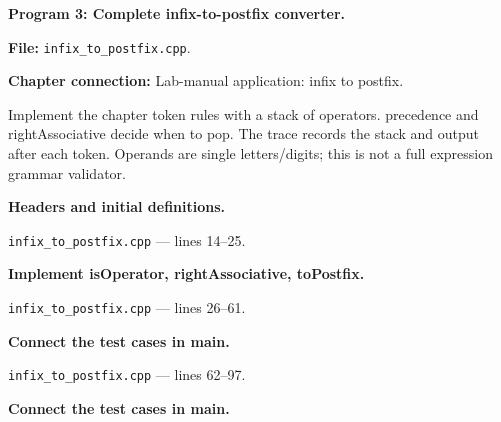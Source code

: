 \textbf{Program 3: Complete infix-to-postfix converter.}

\textbf{File:} \texttt{infix\_to\_postfix.cpp}.

\textbf{Chapter connection:} Lab-manual application: infix to postfix.

Implement the chapter token rules with a stack of operators. precedence and rightAssociative decide when to pop. The trace records the stack and output after each token. Operands are single letters/digits; this is not a full expression grammar validator.



\begin{utpsteps}\setcounter{enumi}{0}\item \textbf{Headers and initial definitions.}\end{utpsteps}

\texttt{infix\_to\_postfix.cpp} --- lines 14--25.




\tcbbreak

\begin{utpsteps}\setcounter{enumi}{1}\item \textbf{Implement isOperator, rightAssociative, toPostfix.}\end{utpsteps}

\texttt{infix\_to\_postfix.cpp} --- lines 26--61.






\tcbbreak

\begin{utpsteps}\setcounter{enumi}{2}\item \textbf{Connect the test cases in main.}\end{utpsteps}

\texttt{infix\_to\_postfix.cpp} --- lines 62--97.




\tcbbreak

\begin{utpsteps}\setcounter{enumi}{3}\item \textbf{Connect the test cases in main.}\end{utpsteps}

